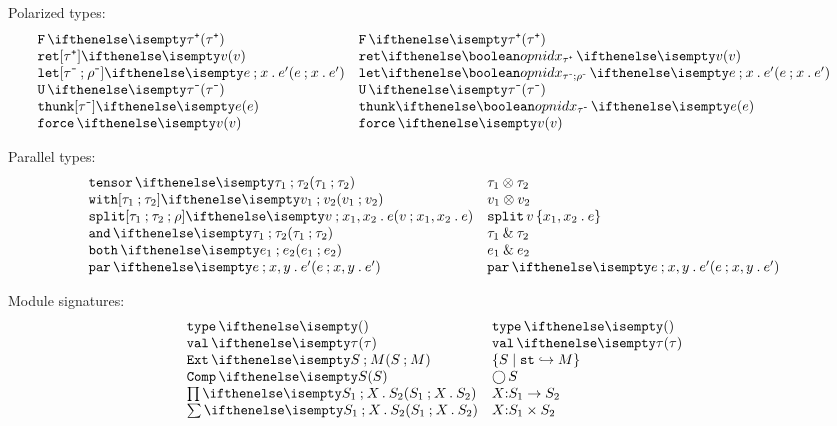 \documentclass[11pt,twoside]{article}
\begin{document}
\noindent Polarized types:
\begin{displaymath}
  \begin{array}{l@{\quad}l@{\quad}l}
    \freeTy{\posTy{\tau}}   & \freeTy*{\posTy{\tau}} \\
    \freeEx[\posTy{\tau}]{v} & \freeEx*[\posTy{\tau}]{v} \\
    \fletEx[\negTy{\tau}][\negTy{\rho}]{e}{x}{e'} & \fletEx*{e}{x}{e'} \\
    \thunkTy{\negTy{\tau}}  & \thunkTy*{\negTy{\tau}} \\
    \thunkEx[\negTy{\tau}]{e} & \thunkEx*{e} \\
    \forceEx{v}   & \forceEx*{v}
  \end{array}
\end{displaymath}

\noindent Parallel types:
\begin{displaymath}
  \begin{array}{l@{\quad}l@{\quad}l}
    \tensorTy{\tau_1}{\tau_2} & \tensorTy*{\tau_1}{\tau_2} \\
    \tensorEx{v_1}{v_2} & \tensorEx*{v_1}{v_2} \\
    \splitEx{v}{x_1}{x_2}{e} & \splitEx*{v}{x_1}{x_2}{e} \\
    \bothTy{\tau_1}{\tau_2} & \bothTy*{\tau_1}{\tau_2} \\
    \bothEx{e_1}{e_2} & \bothEx*{e_1}{e_2} \\
    \parEx{e}{x}{y}{e'} & \parEx*{e}{x}{y}{e'}
  \end{array}
\end{displaymath}

\noindent Module signatures:
\begin{displaymath}
  \begin{array}{l@{\quad}l@{\quad}l}
    \univSg  & \univSg* \\
    \valSg{\tau} & \valSg*{\tau} \\
    \extSg{S}{M} & \extSg*{S}{M} \\
    \compSg{S}  & \compSg*{S} \\
    \piSg{S_1}{X}{S_2} & \piSg*{S_1}{X}{S_2} \\
    \sigSg{S_1}{X}{S_2} & \sigSg*{S_1}{X}{S_2}
  \end{array}
\end{displaymath}
\end{document}
